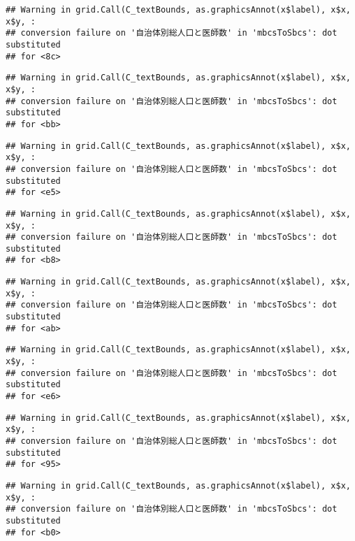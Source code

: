 \documentclass[
]{article}
\begin{document}
\begin{verbatim}
## Warning in grid.Call(C_textBounds, as.graphicsAnnot(x$label), x$x, x$y, :
## conversion failure on '自治体別総人口と医師数' in 'mbcsToSbcs': dot substituted
## for <8c>
\end{verbatim}

\begin{verbatim}
## Warning in grid.Call(C_textBounds, as.graphicsAnnot(x$label), x$x, x$y, :
## conversion failure on '自治体別総人口と医師数' in 'mbcsToSbcs': dot substituted
## for <bb>
\end{verbatim}

\begin{verbatim}
## Warning in grid.Call(C_textBounds, as.graphicsAnnot(x$label), x$x, x$y, :
## conversion failure on '自治体別総人口と医師数' in 'mbcsToSbcs': dot substituted
## for <e5>
\end{verbatim}

\begin{verbatim}
## Warning in grid.Call(C_textBounds, as.graphicsAnnot(x$label), x$x, x$y, :
## conversion failure on '自治体別総人口と医師数' in 'mbcsToSbcs': dot substituted
## for <b8>
\end{verbatim}

\begin{verbatim}
## Warning in grid.Call(C_textBounds, as.graphicsAnnot(x$label), x$x, x$y, :
## conversion failure on '自治体別総人口と医師数' in 'mbcsToSbcs': dot substituted
## for <ab>
\end{verbatim}

\begin{verbatim}
## Warning in grid.Call(C_textBounds, as.graphicsAnnot(x$label), x$x, x$y, :
## conversion failure on '自治体別総人口と医師数' in 'mbcsToSbcs': dot substituted
## for <e6>
\end{verbatim}

\begin{verbatim}
## Warning in grid.Call(C_textBounds, as.graphicsAnnot(x$label), x$x, x$y, :
## conversion failure on '自治体別総人口と医師数' in 'mbcsToSbcs': dot substituted
## for <95>
\end{verbatim}

\begin{verbatim}
## Warning in grid.Call(C_textBounds, as.graphicsAnnot(x$label), x$x, x$y, :
## conversion failure on '自治体別総人口と医師数' in 'mbcsToSbcs': dot substituted
## for <b0>
\end{verbatim}
\end{document}
